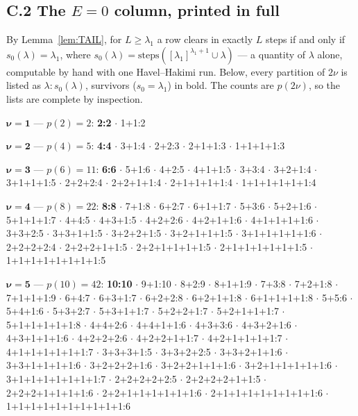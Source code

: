 \subsection*{C.2 The \texorpdfstring{$E = 0$}{E = 0} column, printed in full}

By Lemma~\ref{lem:TAIL}, for $L \ge \lambda_1$ a row clears in exactly $L$ steps if and only
if $s_0(\lambda) = \lambda_1$, where
$s_0(\lambda) = \mathrm{steps}([\lambda_1]^{\lambda_1+1} \cup \lambda)$ --- a quantity of
$\lambda$ alone, computable by hand with one Havel--Hakimi run. Below, every partition of
$2\nu$ is listed as $\lambda : s_0(\lambda)$, survivors ($s_0 = \lambda_1$) in bold. The
counts are $p(2\nu)$, so the lists are complete by inspection.

{\small\sloppy\noindent
$\boldsymbol{\nu = 1}$ --- $p(2) = 2$:\quad
\textbf{2:2} $\cdot$ 1+1:2

\noindent
$\boldsymbol{\nu = 2}$ --- $p(4) = 5$:\quad
\textbf{4:4} $\cdot$ 3+1:4 $\cdot$ 2+2:3 $\cdot$ 2+1+1:3 $\cdot$ 1+1+1+1:3

\noindent
$\boldsymbol{\nu = 3}$ --- $p(6) = 11$:\quad
\textbf{6:6} $\cdot$ 5+1:6 $\cdot$ 4+2:5 $\cdot$ 4+1+1:5 $\cdot$ 3+3:4 $\cdot$ 3+2+1:4
$\cdot$ 3+1+1+1:5 $\cdot$ 2+2+2:4 $\cdot$ 2+2+1+1:4 $\cdot$ 2+1+1+1+1:4 $\cdot$
1+1+1+1+1+1:4

\noindent
$\boldsymbol{\nu = 4}$ --- $p(8) = 22$:\quad
\textbf{8:8} $\cdot$ 7+1:8 $\cdot$ 6+2:7 $\cdot$ 6+1+1:7 $\cdot$ 5+3:6 $\cdot$ 5+2+1:6
$\cdot$ 5+1+1+1:7 $\cdot$ 4+4:5 $\cdot$ 4+3+1:5 $\cdot$ 4+2+2:6 $\cdot$ 4+2+1+1:6 $\cdot$
4+1+1+1+1:6 $\cdot$ 3+3+2:5 $\cdot$ 3+3+1+1:5 $\cdot$ 3+2+2+1:5 $\cdot$ 3+2+1+1+1:5 $\cdot$
3+1+1+1+1+1:6 $\cdot$ 2+2+2+2:4 $\cdot$ 2+2+2+1+1:5 $\cdot$ 2+2+1+1+1+1:5 $\cdot$
2+1+1+1+1+1+1:5 $\cdot$ 1+1+1+1+1+1+1+1:5

\noindent
$\boldsymbol{\nu = 5}$ --- $p(10) = 42$:\quad
\textbf{10:10} $\cdot$ 9+1:10 $\cdot$ 8+2:9 $\cdot$ 8+1+1:9 $\cdot$ 7+3:8 $\cdot$ 7+2+1:8
$\cdot$ 7+1+1+1:9 $\cdot$ 6+4:7 $\cdot$ 6+3+1:7 $\cdot$ 6+2+2:8 $\cdot$ 6+2+1+1:8 $\cdot$
6+1+1+1+1:8 $\cdot$ 5+5:6 $\cdot$ 5+4+1:6 $\cdot$ 5+3+2:7 $\cdot$ 5+3+1+1:7 $\cdot$
5+2+2+1:7 $\cdot$ 5+2+1+1+1:7 $\cdot$ 5+1+1+1+1+1:8 $\cdot$ 4+4+2:6 $\cdot$ 4+4+1+1:6
$\cdot$ 4+3+3:6 $\cdot$ 4+3+2+1:6 $\cdot$ 4+3+1+1+1:6 $\cdot$ 4+2+2+2:6 $\cdot$
4+2+2+1+1:7 $\cdot$ 4+2+1+1+1+1:7 $\cdot$ 4+1+1+1+1+1+1:7 $\cdot$ 3+3+3+1:5 $\cdot$
3+3+2+2:5 $\cdot$ 3+3+2+1+1:6 $\cdot$ 3+3+1+1+1+1:6 $\cdot$ 3+2+2+2+1:6 $\cdot$
3+2+2+1+1+1:6 $\cdot$ 3+2+1+1+1+1+1:6 $\cdot$ 3+1+1+1+1+1+1+1:7 $\cdot$ 2+2+2+2+2:5 $\cdot$
2+2+2+2+1+1:5 $\cdot$ 2+2+2+1+1+1+1:6 $\cdot$ 2+2+1+1+1+1+1+1:6 $\cdot$
2+1+1+1+1+1+1+1+1:6 $\cdot$ 1+1+1+1+1+1+1+1+1+1:6

}
